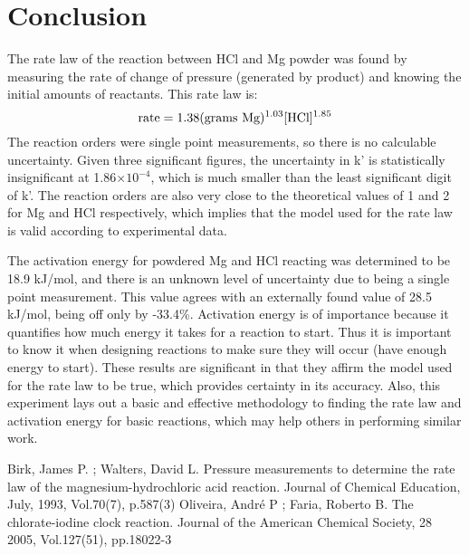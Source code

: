 \documentclass[12pt, letterpaper]{article}
\begin{document}
\section{Conclusion}
The rate law of the reaction between HCl and Mg powder was found by measuring the rate of change of pressure (generated by  product) and knowing the initial amounts of reactants. This rate law is:
\begin{equation}
\textnormal{rate}  = 1.38 (\textnormal{grams Mg})^{1.03} [\textnormal{HCl}]^{1.85}
\end{equation}
The reaction orders were single point measurements, so there is no calculable uncertainty. Given three significant figures, the uncertainty in k' is statistically insignificant  at 1.86$\times 10^{-4}$, which is much smaller than the least significant digit of k'. The reaction orders are also very close to the theoretical values of 1 and 2 for Mg and HCl respectively, which implies that the model used for the rate law is valid according to experimental data.\\\par

The activation energy for powdered Mg and HCl reacting was determined to be 18.9 kJ/mol, and there is an unknown level of uncertainty due to being a single point measurement. This value agrees with an externally found value of 28.5 kJ/mol, being off only by -33.4\%. Activation energy is of importance because it quantifies how much energy it takes for a reaction to start. Thus it is important to know it when designing reactions to make sure they will occur (have enough energy to start). These results are significant in that they affirm the model used for the rate law to be true, which provides certainty in its accuracy. Also, this experiment lays out a basic and effective methodology to finding the rate law and activation energy for basic reactions, which may help others in performing similar work.

\vspace{-12pt}
\begin{thebibliography}{11}
\raggedright

Birk, James P. ; 
Walters, David L.
Pressure measurements to determine the rate law of the magnesium-hydrochloric acid reaction.
Journal of Chemical Education, July, 1993, Vol.70(7), p.587(3)
Oliveira, André P ; Faria, Roberto B.
The chlorate-iodine clock reaction.
Journal of the American Chemical Society, 28 2005, Vol.127(51), pp.18022-3
	
	
	
\end{thebibliography}
\end{document}
